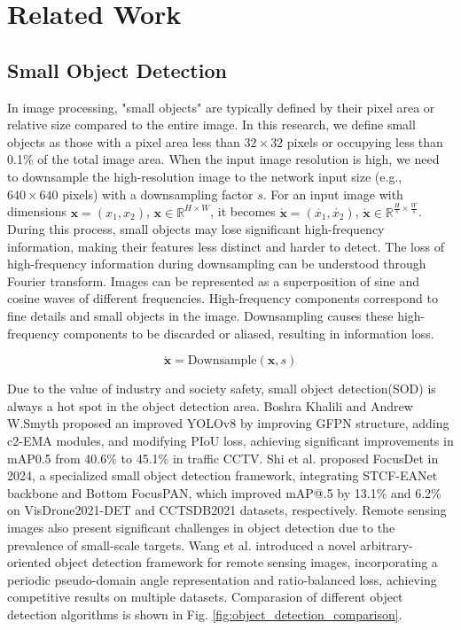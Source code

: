 \documentclass[10pt]{article}
\begin{document}
\section{Related Work}

\subsection{Small Object Detection}
In image processing, "small objects" are typically defined by their pixel area or relative size compared to the entire image. In this research, we define small objects as those with a pixel area less than $32 \times 32$ pixels or occupying less than 0.1\% of the total image area\cite{lin2014microsoft}. When the input image resolution is high, we need to downsample the high-resolution image to the network input size (e.g., $640 \times 640$ pixels) with a downsampling factor $s$. For an input image with dimensions $\bm{x} = (x_1, x_2)$, $\bm{x} \in \mathbb{R}^{H \times W}$, it becomes $\acute{\bm{x}} = (\acute{x_1}, \acute{x_2})$, $\acute{\bm{x}} \in \mathbb{R}^{\frac{H}{s} \times \frac{W}{s}}$. During this process, small objects may lose significant high-frequency information, making their features less distinct and harder to detect. The loss of high-frequency information during downsampling can be understood through Fourier transform. Images can be represented as a superposition of sine and cosine waves of different frequencies. High-frequency components correspond to fine details and small objects in the image. Downsampling causes these high-frequency components to be discarded or aliased, resulting in information loss.

\begin{equation}
  \acute{\bm{x}} = \text{Downsample}(\bm{x}, s)
  \label{eq:downsample}
\end{equation}

Due to the value of industry and society safety, small object detection(SOD) is always a hot spot in the object detection area.  Boshra Khalili and Andrew W.Smyth proposed an improved YOLOv8 by improving GFPN structure, adding c2-EMA modules, and modifying PIoU loss, achieving significant improvements in mAP0.5 from 40.6\% to 45.1\% in traffic CCTV.\cite{khalili2024sodyolo} Shi et al. proposed FocusDet in 2024, a specialized small object detection framework, integrating STCF-EANet backbone and Bottom FocusPAN, which improved mAP@.5 by 13.1\% and 6.2\% on VisDrone2021-DET and CCTSDB2021 datasets, respectively.\cite{shi2024focusdet} Remote sensing images also present significant challenges in object detection due to the prevalence of small-scale targets. Wang et al. introduced a novel arbitrary-oriented object detection framework for remote sensing images, incorporating a periodic pseudo-domain angle representation and ratio-balanced loss, achieving competitive results on multiple datasets.\cite{wang2023oriented} Comparasion of different object detection algorithms is shown in Fig. \ref{fig:object_detection_comparison}.
\end{document}
